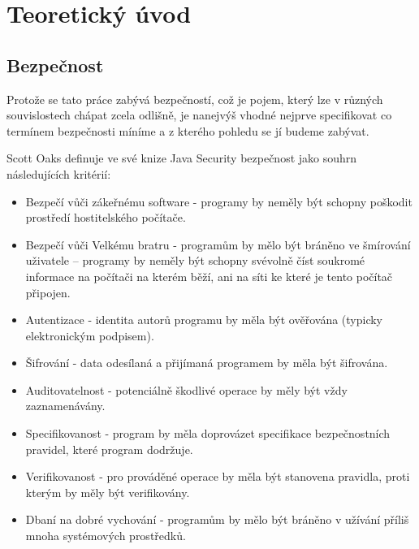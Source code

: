 
\chapter{Teoretický úvod}

\section{Bezpečnost}

Protože se tato práce zabývá bezpečností, což je pojem, který lze v různých souvislostech chápat zcela odlišně, je nanejvýš vhodné nejprve specifikovat co termínem bezpečnosti míníme a z kterého pohledu se jí budeme zabývat.

Scott Oaks definuje ve své knize Java Security bezpečnost jako souhrn následujících kritérií: \cite[1.1]{oaks}

\begin{itemize}
  \item Bezpečí vůči zákeřnému software - programy by neměly být schopny poškodit prostředí hostitelského počítače.
  \item Bezpečí vůči Velkému bratru - programům by mělo být bráněno ve šmírování uživatele -- programy by neměly být schopny svévolně číst soukromé informace na počítači na kterém běží, ani na síti ke které je tento počítač připojen.
  \item Autentizace - identita autorů programu by měla být ověřována (typicky elektronickým podpisem).
  \item Šifrování - data odesílaná a přijímaná programem by měla být šifrována.
  \item Auditovatelnost - potenciálně škodlivé operace by měly být vždy zaznamenávány.
  \item Specifikovanost - program by měla doprovázet specifikace bezpečnostních pravidel, které program dodržuje.
  \item Verifikovanost - pro prováděné operace by měla být stanovena pravidla, proti kterým by měly být verifikovány.
  \item Dbaní na dobré vychování - programům by mělo být bráněno v užívání příliš mnoha systémových prostředků.
\end{itemize}

